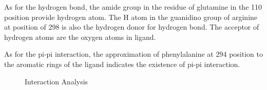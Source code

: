 \documentclass{report}
\begin{document}
As for the hydrogen bond, the amide group in the residue of glutamine in the 110 position provide hydrogen atom.
The H atom in the guanidino group of arginine at position of 298 is also the hydrogen donor for hydrogen bond.
The acceptor of hydrogen atoms are the oxygen atoms in ligand.

As for the pi-pi interaction, the approximation of phenylalanine at 294 position to the aromatic rings of the ligand indicates the existence of pi-pi interaction.
\begin{figure}
    \centering
    \caption{Interaction Analysis}
    \label{Interaction Analysis}
    
\end{figure}
\end{document}
